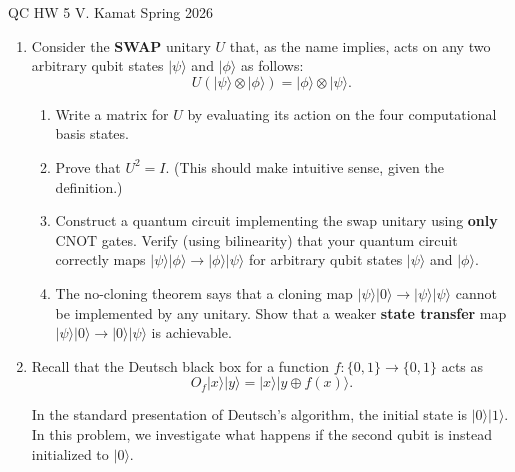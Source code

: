 \documentclass[12pt]{article}
\begin{document}
	
\centerline{QC HW 5
	\hspace{0.4 in}V. Kamat
	\hspace{0.4 in}Spring 2026}

\begin{enumerate}
\item Consider the \textbf{SWAP} unitary $U$ that, as the name implies, acts on any two arbitrary qubit states $|\psi\rangle$ and $|\phi\rangle$ as follows:
$$U\left(|\psi\rangle \otimes |\phi\rangle\right)=|\phi\rangle\otimes |\psi\rangle.$$
\begin{enumerate}
    \item Write a matrix for $U$ by evaluating its action on the four computational basis states.
    \item Prove that $U^2=I$. (This should make intuitive sense, given the definition.)
    \item Construct a quantum circuit implementing the swap unitary using \textbf{only} $\text{CNOT}$ gates. Verify (using bilinearity) that your quantum circuit correctly maps $|\psi\rangle|\phi\rangle\to |\phi\rangle|\psi\rangle$ for arbitrary qubit states $|\psi\rangle$ and $|\phi\rangle$. 
    \item The no-cloning theorem says that a cloning map $|\psi\rangle|0\rangle\to |\psi\rangle|\psi\rangle$ cannot be implemented by any unitary. Show that a weaker \textbf{state transfer} map $|\psi\rangle|0\rangle\to |0\rangle|\psi\rangle$ is achievable. 
\end{enumerate}
\item Recall that the Deutsch black box for a function $f:\{0,1\}\to \{0,1\}$ acts as
\[
O_f |x\rangle|y\rangle = |x\rangle|y \oplus f(x)\rangle.
\]


In the standard presentation of Deutsch's algorithm, the initial state is $|0\rangle|1\rangle$. In this problem, we investigate what happens if the second qubit is instead initialized to $|0\rangle$.


\end{enumerate}
\end{document}
